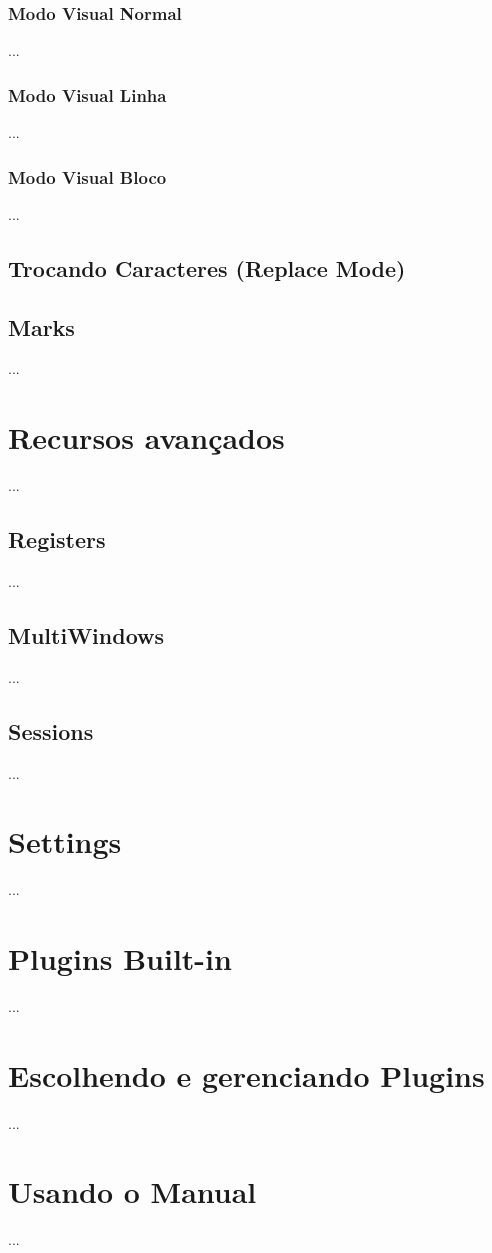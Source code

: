 \documentclass[a4paper, 12pt]{article}
\begin{document}
\subsubsection{Modo Visual Normal}
...
\subsubsection{Modo Visual Linha}
...
\subsubsection{Modo Visual Bloco}
...
\subsection{Trocando Caracteres (Replace Mode)}



\subsection{Marks}
...

\newpage
\section{Recursos avançados}
...
\subsection{Registers}
...

\subsection{MultiWindows}
...

\subsection{Sessions}
...
\newpage

\section{Settings}
...
\newpage

\section{Plugins Built-in}
...
\newpage

\section{Escolhendo e gerenciando Plugins}
...
\newpage

\section{Usando o Manual}
...
\newpage
\end{document}
